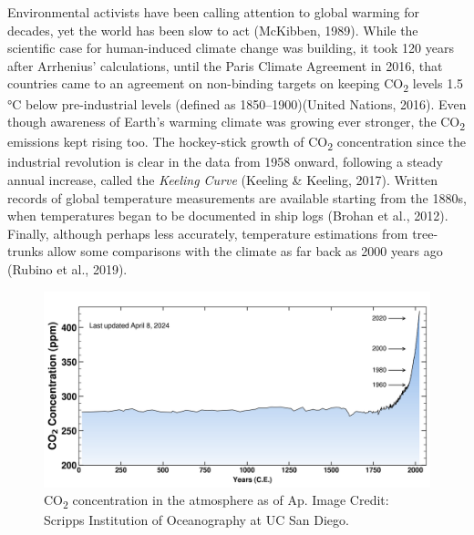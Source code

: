 \documentclass[
  letterpaper,
  DIV=11,
  numbers=noendperiod]{scrartcl}
\begin{document}
Environmental activists have been calling attention to global warming
for decades, yet the world has been slow to act (McKibben, 1989). While
the scientific case for human-induced climate change was building, it
took 120 years after Arrhenius' calculations, until the Paris Climate
Agreement in 2016, that countries came to an agreement on non-binding
targets on keeping CO\textsubscript{2} levels 1.5 °C below
pre-industrial levels (defined as 1850--1900)(United Nations, 2016).
Even though awareness of Earth's warming climate was growing ever
stronger, the CO\textsubscript{2} emissions kept rising too. The
hockey-stick growth of CO\textsubscript{2} concentration since the
industrial revolution is clear in the data from 1958 onward, following a
steady annual increase, called the \emph{Keeling Curve} (Keeling \&
Keeling, 2017). Written records of global temperature measurements are
available starting from the 1880s, when temperatures began to be
documented in ship logs (Brohan et al., 2012). Finally, although perhaps
less accurately, temperature estimations from tree-trunks allow some
comparisons with the climate as far back as 2000 years ago (Rubino et
al., 2019).

\begin{figure}[H]

{\centering \includegraphics{./images/sustainability/co2-concentration.png}

}

\caption{CO\textsubscript{2} concentration in the atmosphere as of Ap.
Image Credit: Scripps Institution of Oceanography at UC San Diego.}

\end{figure}%
\end{document}
